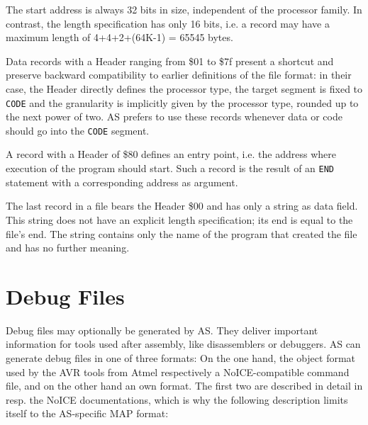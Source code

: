 \documentclass[12pt,twoside]{report}
\newcommand{\tty}[1]{{\tt #1}}
\begin{document}
The start address is always 32 bits in size, independent of the
processor family.  In contrast, the length specification has only 16
bits, i.e. a record may have a maximum length of 4+4+2+(64K-1) =
65545 bytes.

Data records with a Header ranging from \$01 to \$7f present a shortcut
and preserve backward compatibility to earlier definitions of the
file format: in their case, the Header directly defines the processor
type, the target segment is fixed to \tty{CODE} and the granularity is
implicitly given by the processor type, rounded up to the next power
of two.  AS prefers to use these records whenever data or code should
go into the \tty{CODE} segment.

A record with a Header of \$80 defines an entry point, i.e. the
address where execution of the program should start.  Such a record
is the result of an \tty{END} statement with a corresponding address as
argument.

The last record in a file bears the Header \$00 and has only a string
as data field.  This string does not have an explicit length
specification; its end is equal to the file's end.  The string
contains only the name of the program that created the file and has
no further meaning.


\section{Debug Files}
\label{SectDebugFormat}

Debug files may optionally be generated by AS.  They deliver important
information for tools used after assembly, like disassemblers or
debuggers.  AS can generate debug files in one of three formats: On the
one hand, the object format used by the AVR tools from Atmel respectively
a NoICE-compatible command file, and on the other hand an own format.  The
first two are described in detail in \cite{AVRObj} resp. the NoICE
documentations, which is why the following description limits itself to
the AS-specific MAP format:
\end{document}
